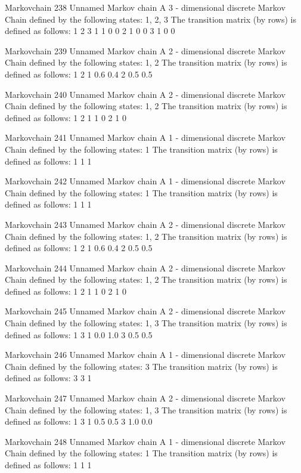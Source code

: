 \documentclass[
  nojss]{jss}
\begin{document}
\begin{CodeChunk}
\begin{CodeOutput}
Markovchain  238 
Unnamed Markov chain 
 A  3 - dimensional discrete Markov Chain defined by the following states: 
 1, 2, 3 
 The transition matrix  (by rows)  is defined as follows: 
  1 2 3
1 1 0 0
2 1 0 0
3 1 0 0

Markovchain  239 
Unnamed Markov chain 
 A  2 - dimensional discrete Markov Chain defined by the following states: 
 1, 2 
 The transition matrix  (by rows)  is defined as follows: 
    1   2
1 0.6 0.4
2 0.5 0.5

Markovchain  240 
Unnamed Markov chain 
 A  2 - dimensional discrete Markov Chain defined by the following states: 
 1, 2 
 The transition matrix  (by rows)  is defined as follows: 
  1 2
1 1 0
2 1 0

Markovchain  241 
Unnamed Markov chain 
 A  1 - dimensional discrete Markov Chain defined by the following states: 
 1 
 The transition matrix  (by rows)  is defined as follows: 
  1
1 1

Markovchain  242 
Unnamed Markov chain 
 A  1 - dimensional discrete Markov Chain defined by the following states: 
 1 
 The transition matrix  (by rows)  is defined as follows: 
  1
1 1

Markovchain  243 
Unnamed Markov chain 
 A  2 - dimensional discrete Markov Chain defined by the following states: 
 1, 2 
 The transition matrix  (by rows)  is defined as follows: 
    1   2
1 0.6 0.4
2 0.5 0.5

Markovchain  244 
Unnamed Markov chain 
 A  2 - dimensional discrete Markov Chain defined by the following states: 
 1, 2 
 The transition matrix  (by rows)  is defined as follows: 
  1 2
1 1 0
2 1 0

Markovchain  245 
Unnamed Markov chain 
 A  2 - dimensional discrete Markov Chain defined by the following states: 
 1, 3 
 The transition matrix  (by rows)  is defined as follows: 
    1   3
1 0.0 1.0
3 0.5 0.5

Markovchain  246 
Unnamed Markov chain 
 A  1 - dimensional discrete Markov Chain defined by the following states: 
 3 
 The transition matrix  (by rows)  is defined as follows: 
  3
3 1

Markovchain  247 
Unnamed Markov chain 
 A  2 - dimensional discrete Markov Chain defined by the following states: 
 1, 3 
 The transition matrix  (by rows)  is defined as follows: 
    1   3
1 0.5 0.5
3 1.0 0.0

Markovchain  248 
Unnamed Markov chain 
 A  1 - dimensional discrete Markov Chain defined by the following states: 
 1 
 The transition matrix  (by rows)  is defined as follows: 
  1
1 1


\end{CodeOutput}
\end{CodeChunk}
\end{document}
